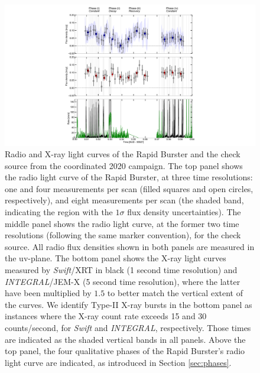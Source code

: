 \documentclass[fleqn,usenatbib]{mnras}
\begin{document}
\begin{figure}
\includegraphics[width=\textwidth]{ALL_LCs_annotated.pdf}
 \caption{Radio and X-ray light curves of the Rapid Burster and the check source from the coordinated 2020 campaign. The top panel shows the radio light curve of the Rapid Burster, at three time resolutions: one and four measurements per scan (filled squares and open circles, respectively), and eight measurements per scan (the shaded band, indicating the region with the $1\sigma$ flux density uncertainties). The middle panel shows the radio light curve, at the former two time resolutions (following the same marker convention), for the check source. All radio flux densities shown in both panels are measured in the uv-plane. The bottom panel shows the X-ray light curves measured by \textit{Swift}/XRT in black (1 second time resolution) and \textit{INTEGRAL}/JEM-X (5 second time resolution), where the latter have been multiplied by $1.5$ to better match the vertical extent of the curves. We identify Type-II X-ray bursts in the bottom panel as instances where the X-ray count rate exceeds 15 and 30 counts/second, for \textit{Swift} and \textit{INTEGRAL}, respectively. Those times are indicated as the shaded vertical bands in all panels. Above the top panel, the four qualitative phases of the Rapid Burster's radio light curve are indicated, as introduced in Section \ref{sec:phases}. }
 \label{fig:all_lcs}
\end{figure}
\end{document}
